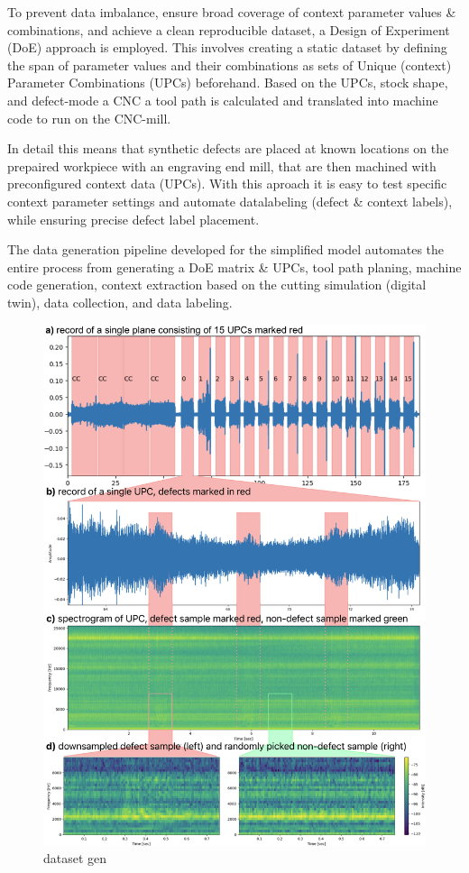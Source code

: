 \documentclass[5p,times,procedia]{elsarticle}
\begin{document}
To prevent data imbalance, ensure broad coverage of context parameter values \& combinations, and achieve a clean reproducible dataset, a Design of Experiment (DoE) approach is employed. This involves creating a static dataset by defining the span of parameter values and their combinations as sets of Unique (context) Parameter Combinations (UPCs) beforehand.
Based on the UPCs, stock shape, and defect-mode a CNC a tool path is calculated and translated into machine code to run on the CNC-mill. 


In detail this means that synthetic defects are placed at known locations on the prepaired workpiece with an engraving end mill, that are then machined with preconfigured context data (UPCs). 
With this aproach it is easy to test specific context parameter settings and automate datalabeling (defect \& context labels), while ensuring precise defect label placement.


The data generation pipeline developed for the simplified model automates the entire process from generating a DoE matrix \& UPCs, tool path planing, machine code generation, context extraction based on the cutting simulation (digital twin), data collection, and data labeling.

\begin{figure}[t]
    \centering
    \includegraphics[width=0.99\linewidth]{dataset_gen.png}
    \caption{dataset gen}
    \label{dataset_gen}
\end{figure}
\end{document}
